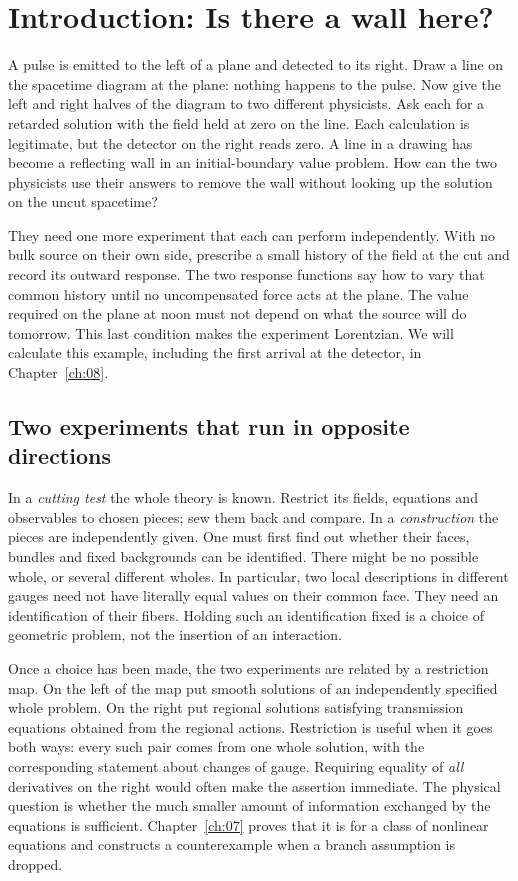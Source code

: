 \chapter*{Introduction: Is there a wall here?}\label{ch:intro}
A pulse is emitted to the left of a plane and detected to its right. Draw a line on the spacetime diagram at the plane: nothing happens to the pulse. Now give the left and right halves of the diagram to two different physicists. Ask each for a retarded solution with the field held at zero on the line. Each calculation is legitimate, but the detector on the right reads zero. A line in a drawing has become a reflecting wall in an initial-boundary value problem. How can the two physicists use their answers to remove the wall without looking up the solution on the uncut spacetime?

They need one more experiment that each can perform independently. With no bulk source on their own side, prescribe a small history of the field at the cut and record its outward response. The two response functions say how to vary that common history until no uncompensated force acts at the plane. The value required on the plane at noon must not depend on what the source will do tomorrow. This last condition makes the experiment Lorentzian. We will calculate this example, including the first arrival at the detector, in Chapter~\ref{ch:08}.

\section*{Two experiments that run in opposite directions}
In a \emph{cutting test} the whole theory is known. Restrict its fields, equations and observables to chosen pieces; sew them back and compare. In a \emph{construction} the pieces are independently given. One must first find out whether their faces, bundles and fixed backgrounds can be identified. There might be no possible whole, or several different wholes. In particular, two local descriptions in different gauges need not have literally equal values on their common face. They need an identification of their fibers. Holding such an identification fixed is a choice of geometric problem, not the insertion of an interaction.

Once a choice has been made, the two experiments are related by a restriction map. On the left of the map put smooth solutions of an independently specified whole problem. On the right put regional solutions satisfying transmission equations obtained from the regional actions. Restriction is useful when it goes both ways: every such pair comes from one whole solution, with the corresponding statement about changes of gauge. Requiring equality of \emph{all} derivatives on the right would often make the assertion immediate. The physical question is whether the much smaller amount of information exchanged by the equations is sufficient. Chapter~\ref{ch:07} proves that it is for a class of nonlinear equations and constructs a counterexample when a branch assumption is dropped.

